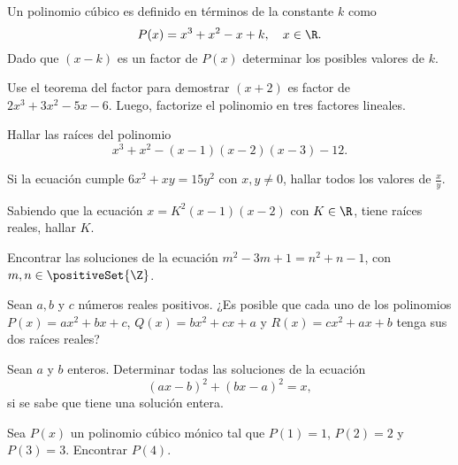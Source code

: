 \begin{multicols}{2}
    \begin{exercise}
        Un polinomio cúbico es definido en términos de la constante $k$ como
        \[
            P(x) = x^3 + x^2 - x + k,\quad x \in \R.
        \]
        Dado que $(x - k)$ es un factor de $P(x)$ determinar los posibles valores de $k$.
    \end{exercise}

    \begin{exercise}
        Use el teorema del factor para demostrar $(x + 2)$ es factor de $2x^3 + 3x^2 - 5x - 6$.
        Luego, factorize el polinomio en tres factores lineales.
    \end{exercise}

    \begin{exercise}
        Hallar las raíces del polinomio
        \[
            x^3 + x^2 - (x - 1)(x - 2)(x - 3) - 12.
        \]
    \end{exercise}

    \begin{exercise}
        Si la ecuación cumple $6x^2 + xy = 15y^2$ con $x, y \neq 0$, hallar todos los valores de $\frac{x}{y}$.
    \end{exercise}

    \begin{exercise}
        Sabiendo que la ecuación $x = K^2(x - 1)(x - 2)$ con $K \in \R$, tiene raíces reales, hallar $K$.
    \end{exercise}

    \begin{exercise}
        Encontrar las soluciones de la ecuación $m^2 - 3m + 1 = n^2 + n - 1$, con $m, n \in \positiveSet{\Z}$.
    \end{exercise}

    \begin{problem}
        Sean $a, b$ y $c$ números reales positivos.
        ¿Es posible que cada uno de los polinomios $P(x) = ax^2 + bx + c$, $Q(x) = bx^2 + cx + a$ y $R(x) = cx^2 + ax + b$ tenga sus dos raíces reales?
    \end{problem}

    \begin{problem}
        Sean $a$ y $b$ enteros.
        Determinar todas las soluciones de la ecuación
        \[
            (ax - b)^2 + (bx - a)^2 =  x,
        \] si se sabe que tiene una solución entera.
    \end{problem}

    \begin{problem}
        Sea $P(x)$ un polinomio cúbico mónico tal que $P(1) = 1$, $P(2) = 2$ y $P(3) = 3$.
        Encontrar $P(4).$
    \end{problem}
\end{multicols}